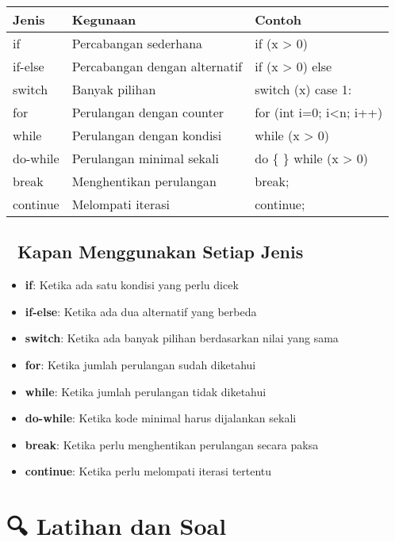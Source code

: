 \begin{center}
\begin{tabular}{|l|l|l|}
\hline
\textbf{Jenis} & \textbf{Kegunaan} & \textbf{Contoh} \\
\hline
if & Percabangan sederhana & if (x > 0) \\
\hline
if-else & Percabangan dengan alternatif & if (x > 0) else \\
\hline
switch & Banyak pilihan & switch (x) case 1: \\
\hline
for & Perulangan dengan counter & for (int i=0; i<n; i++) \\
\hline
while & Perulangan dengan kondisi & while (x > 0) \\
\hline
do-while & Perulangan minimal sekali & do \{ \} while (x > 0) \\
\hline
break & Menghentikan perulangan & break; \\
\hline
continue & Melompati iterasi & continue; \\
\hline
\end{tabular}
\end{center}

\subsection{🎯 Kapan Menggunakan Setiap Jenis}

\begin{itemize}
\item \textbf{if}: Ketika ada satu kondisi yang perlu dicek
\item \textbf{if-else}: Ketika ada dua alternatif yang berbeda
\item \textbf{switch}: Ketika ada banyak pilihan berdasarkan nilai yang sama
\item \textbf{for}: Ketika jumlah perulangan sudah diketahui
\item \textbf{while}: Ketika jumlah perulangan tidak diketahui
\item \textbf{do-while}: Ketika kode minimal harus dijalankan sekali
\item \textbf{break}: Ketika perlu menghentikan perulangan secara paksa
\item \textbf{continue}: Ketika perlu melompati iterasi tertentu
\end{itemize}

\section{🔍 Latihan dan Soal}

